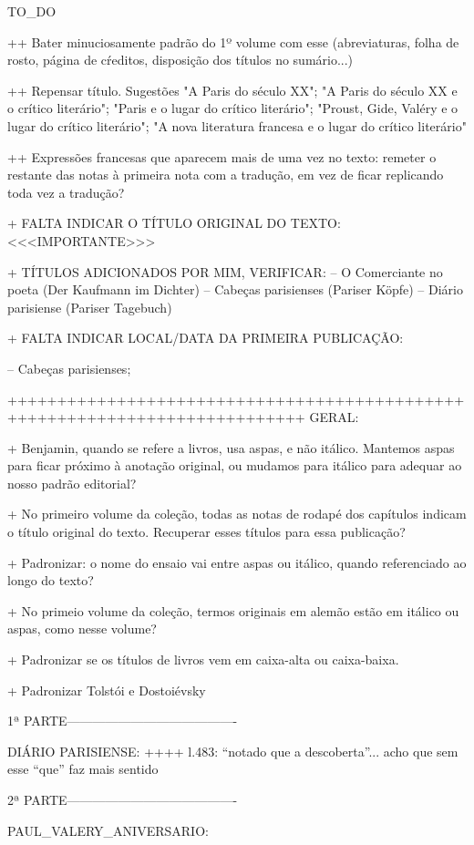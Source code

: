 TO_DO

++ Bater minuciosamente padrão do 1º volume com esse (abreviaturas, folha de rosto, página de cŕeditos, disposição dos títulos no sumário...)

++ Repensar título. Sugestões "A Paris do século XX"; "A Paris do século XX e o crítico literário"; "Paris e o lugar do crítico literário"; "Proust, Gide, Valéry e o lugar do crítico literário"; "A nova literatura francesa e o lugar do crítico literário"

++ Expressões francesas que aparecem mais de uma vez no texto: remeter o restante das notas à primeira nota com a tradução, em vez de ficar replicando toda vez a tradução?

+ FALTA INDICAR O TÍTULO ORIGINAL DO TEXTO: <<<IMPORTANTE>>>

+ TÍTULOS ADICIONADOS POR MIM, VERIFICAR:
-- O Comerciante no poeta (Der Kaufmann im Dichter)
-- Cabeças parisienses (Pariser Köpfe)
-- Diário parisiense (Pariser Tagebuch)


+ FALTA INDICAR LOCAL/DATA DA PRIMEIRA PUBLICAÇÃO:

-- Cabeças parisienses; 

++++++++++++++++++++++++++++++++++++++++++++++++++++++++++++++++++++++++++++
GERAL:

+ Benjamin, quando se refere a livros, usa aspas, e não itálico. Mantemos aspas para ficar próximo à anotação original, ou mudamos para itálico para adequar ao nosso padrão editorial?

+ No primeiro volume da coleção, todas as notas de rodapé dos capítulos indicam o título original do texto. Recuperar esses títulos para essa publicação?

+ Padronizar: o nome do ensaio vai entre aspas ou itálico, quando referenciado ao longo do texto?

+ No primeio volume da coleção, termos originais em alemão estão em itálico ou aspas, como nesse volume?

+ Padronizar se os títulos de livros vem em caixa-alta ou caixa-baixa.

+ Padronizar Tolstói e Dostoiévsky

1ª PARTE----------------------------------------

DIÁRIO PARISIENSE:
++++ l.483: ``notado que a descoberta''... acho que sem esse ``que'' faz mais sentido


2ª PARTE----------------------------------------

PAUL_VALERY_ANIVERSARIO:

